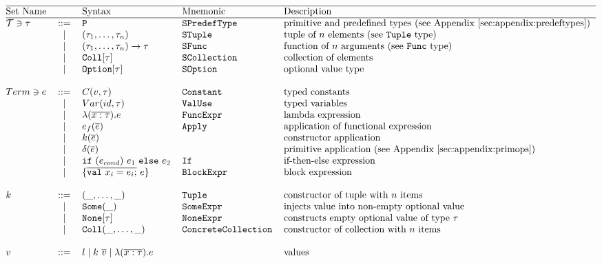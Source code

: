 \[\begin{tabular}{@{}l c l l l} 
\hline
Set Name				&  			& Syntax	& Mnemonic 		& Description \\
\hline
$\mathcal{T} \ni \tau$	& ::= 		& \lst{P} 	& \lst{SPredefType}	& primitive and predefined types (see Appendix~\ref{sec:appendix:predeftypes}) \\

			&	$\mid$	& $(\tau_1, \dots ,\tau_n) $	& \lst{STuple} & tuple of $n$ elements (see \lst{Tuple} type)\\

			&   $\mid$  & $(\tau_1, \dots ,\tau_n) \to \tau $	& \lst{SFunc} & function of $n$ arguments (see \lst{Func} type) \\
			&   $\mid$  & $\text{\lst{Coll}}[\tau]$				& \lst{SCollection} & collection of elements      \\
			&   $\mid$  & $\text{\lst{Option}}[\tau]$			& \lst{SOption} & optional value type       \\
			& 	     	&										& &				\\
$Term\ni e$	& ::= 		&   $C(v, \tau) $						& \lst{Constant} & typed constants  \\
			& 	$\mid$ 	& 	$Var(id, \tau) $ 					& \lst{ValUse} & typed variables  \\
			& 	$\mid$ 	& 	$\TyLam{x}{\tau}{e}$ 				& \lst{FuncExpr} & lambda expression \\
			& 	$\mid$ 	& 	$e_f(\Ov{e})$ 						& \lst{Apply} & application of functional expression \\
			& 	$\mid$ 	& 	$k(\Ov{e})$ 						& & constructor application  \\
			& 	$\mid$ 	& 	$\delta(\Ov{e})$ 					& & primitive application (see Appendix~\ref{sec:appendix:primops}) \\
			& 	$\mid$ 	& 	\lst{if} $(e_{cond})$ $e_1$ \lst{else} $e_2$ & \lst{If} & if-then-else expression \\
			& 	$\mid$ 	&   $\{ \Ov{\text{\lst{val}}~x_i = e_i;}~e\}$  & \lst{BlockExpr} & block expression \\
			& 	     	&										& &				\\
$k$			& ::= 		&   $\Tup{\_, \dots ,\_}$ 				& \lst{Tuple} & constructor of tuple with $n$ items \\
			& 	$\mid$ 	&	$\Some{\_}$		& \lst{SomeExpr} & injects value into non-empty optional value \\
			& 	$\mid$ 	&	$\None{\tau}$	& \lst{NoneExpr} & constructs empty optional value of type $\tau$ \\
			& 	$\mid$ 	&	$\Coll{\_,\dots,\_}$				& \lst{ConcreteCollection} & constructor of collection with $n$ items \\
			& 	     	&										& &				\\
$v$			& ::= 		&   $l \mid k~\Ov{v} \mid \TyLam{x}{\tau}{e}$ 		& & values     	\\
 & & & &  \\
\end{tabular}\] 

